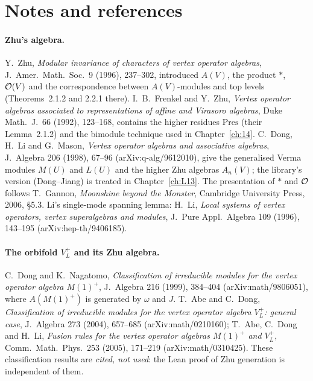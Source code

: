 \section{Notes and references}\label{ch12:sec:refs}

\paragraph{Zhu's algebra.}  Y.~Zhu, \emph{Modular invariance of characters of vertex operator
algebras}, J.\ Amer.\ Math.\ Soc.\ 9 (1996), 237--302, introduced $A(V)$, the product $\ast$,
$\mathcal{O}(V)$ and the correspondence between $A(V)$-modules and top levels (Theorems~2.1.2 and
2.2.1 there).  I.~B.~Frenkel and Y.~Zhu, \emph{Vertex operator algebras associated to representations
of affine and Virasoro algebras}, Duke Math.\ J.\ 66 (1992), 123--168, contains the higher residues
$\mathrm{Pres}$ (their Lemma~2.1.2) and the bimodule technique used in Chapter~\ref{ch:14}.
C.~Dong, H.~Li and G.~Mason, \emph{Vertex operator algebras and associative algebras}, J.\ Algebra 206
(1998), 67--96 (arXiv:q-alg/9612010), give the generalised Verma modules $M(U)$ and $L(U)$ and the higher
Zhu algebras $A_n(V)$; the library's version (Dong--Jiang) is treated in Chapter~\ref{ch:L13}.  The
presentation of $\ast$ and $\mathcal{O}$ follows T.~Gannon, \emph{Moonshine beyond the Monster},
Cambridge University Press, 2006, §5.3.  Li's single-mode spanning lemma: H.~Li, \emph{Local systems of
vertex operators, vertex superalgebras and modules}, J.\ Pure Appl.\ Algebra 109 (1996), 143--195
(arXiv:hep-th/9406185).

\paragraph{The orbifold $V_L^+$ and its Zhu algebra.}  C.~Dong and K.~Nagatomo, \emph{Classification of
irreducible modules for the vertex operator algebra $M(1)^+$}, J.\ Algebra 216 (1999), 384--404
(arXiv:math/9806051), where $A(M(1)^+)$ is generated by $\omega$ and $J$.  T.~Abe and C.~Dong,
\emph{Classification of irreducible modules for the vertex operator algebra $V_L^+$: general case},
J.\ Algebra 273 (2004), 657--685 (arXiv:math/0210160); T.~Abe, C.~Dong and H.~Li, \emph{Fusion rules for
the vertex operator algebras $M(1)^+$ and $V_L^+$}, Comm.\ Math.\ Phys.\ 253 (2005), 171--219
(arXiv:math/0310425).  These classification results are \emph{cited, not used}: the Lean proof of
Zhu generation is independent of them.

